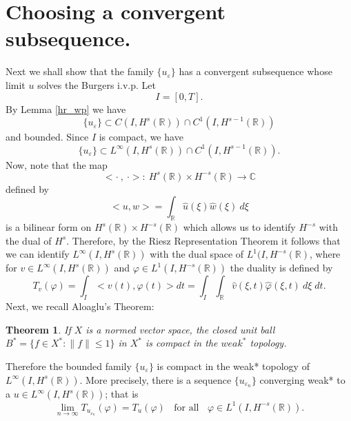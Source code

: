 \documentclass[12pt,reqno]{amsart}
\newcommand{\rr}{\mathbb{R}}
\newcommand{\cc}{\mathbb{C}}
\newcommand{\ee}{\varepsilon}
\theoremstyle{plain}  %
\newtheorem{theorem}{Theorem}
\newtheorem{lemma}{Lemma}
\theoremstyle{definition}
\begin{document}
		\section{Choosing  a convergent subsequence.}
		Next we shall show that  the family $\{ u_\ee\}$ has a convergent subsequence
		whose limit $u$ solves the Burgers i.v.p. 
		Let
		$$
		I= [0, T].
		$$
		By Lemma \ref{hr_wp} we have 
		\begin{equation}
			\label{C-1-fam}
			\{u_\ee\}\subset C(I, H^s(\rr))\cap C^1(I, H^{s-1}(\rr))
		\end{equation}
		and bounded. Since $I$ is compact, we have  
		\begin{equation}
			\label{Lip-1-fam}
			\{u_\ee\}\subset L^{\infty}(I, H^s(\rr))\cap C^1(I,
			H^{s-1}(\rr)).
		\end{equation}
		Now, note that the map $$<\cdot \ , \ \cdot>:\  H^s(\rr) \times H^{-s}(\rr)
		\to \cc$$ defined by $$<u,w> = \int_{\rr} \hat{u} (\xi)
		\hat{w} (\xi) \ d \xi$$ is a bilinear form on $H^s(\rr) \times H^{-s}(\rr)$
		which allows us to identify $H^{-s}$ with the dual of $H^s$.
		Therefore, by the Riesz Representation Theorem it follows that we
		can identify $L^\infty(I, H^s(\rr)) $ with the dual space of
		$L^1(I, H^{-s}(\rr)$, where for $v\in L^\infty(I, H^s(\rr)) $ and
		$ \varphi \in L^1(I, H^{-s}(\rr))$ the duality is defined by  
		\begin{equation}
			T_v(\varphi) = \int_I <v (t), \varphi (t)> dt  = \int_I
			 \int_\rr
			 \widehat{v}(\xi, t) \widehat{\varphi}(\xi, t) \ d \xi \; dt.
		\end{equation}
		Next, we recall Aloaglu's Theorem:
		\begin{theorem}
			If $X$ is a normed vector space,
			the closed unit ball $B^* = \{f \in X^* : \|f\| \le
			1\}$ in $X^*$ is compact in the $weak^*$ topology.
		\end{theorem}
		Therefore the bounded family $\{u_\ee\}$ is compact 
		in the weak* topology of $L^\infty(I, H^{s}(\rr))$. More precisely,
		there is a sequence  $\{ u_{\ee_n} \}$ converging
		weak* to a $ u\in L^{\infty}(I, H^s(\rr))$;
		that is 
		\begin{equation*}
			\label{weak-conv}
			\lim_{n\to \infty} T_{u_{\ee_n}}(\varphi)  =  T_u (\varphi) 
			\; \;		
			\text{ for all } \;\;  \varphi \in L^1(I, H^{-s}(\rr)).
		\end{equation*}
\end{document}

